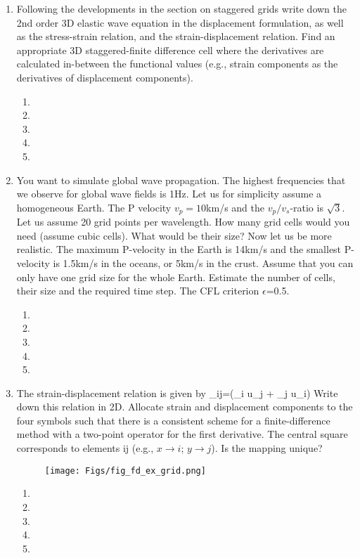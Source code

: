 \begin{enumerate}
\begin{enumerate}
\end{enumerate}
\item
Following the developments in the section on staggered grids write down the 2nd order 3D elastic wave equation in the displacement formulation, as well as    the stress-strain relation, and the strain-displacement relation. Find an appropriate 3D staggered-finite difference cell where the derivatives are calculated in-between the functional values (e.g., strain components as the derivatives of displacement components). 
\begin{enumerate}
\item[]
\item[]
\item[] 
\item[]
\item[] 
\end{enumerate}
\item 
You want to simulate global wave propagation. The highest frequencies that we observe for global wave fields is 1Hz. Let us for simplicity assume a homogeneous Earth. The P velocity $v_p=10$km/s and the $v_p/v_s$-ratio is $\sqrt{3}$. Let us assume 20 grid points per wavelength. How many grid cells would you need (assume cubic cells). What would be their size? Now let us be more realistic. The maximum P-velocity in the Earth is 14km/s and the smallest P-velocity is 1.5km/s in the oceans, or 5km/s in the crust. Assume that you can only have one grid size for the whole Earth. Estimate the number of cells, their size and the required time step. The CFL criterion $\epsilon$=0.5.
\begin{enumerate}
\item[]
\item[]
\item[] 
\item[]
\item[] 
\end{enumerate}
\item
The strain-displacement relation is given by 
\be
\epsilon_{ij}=(\partial_i u_j + \partial_j u_i)
\nonumber
\ee
Write down this relation in 2D. Allocate strain and displacement components to the four symbols such that there is a consistent scheme for a finite-difference method with a two-point operator for the first derivative. The central square corresponds to elements ij (e.g., $x\rightarrow i$; $y \rightarrow j$). Is the mapping unique?  
\begin{figure}
\begin{center}
\texttt{[image: Figs/fig\_fd\_ex\_grid.png]}
\label{fig_fd_ex_grid}
\end{center}
\end{figure}
\begin{enumerate}
\item[]
\item[]
\item[] 
\item[]
\item[] 
\end{enumerate}
\end{enumerate}

